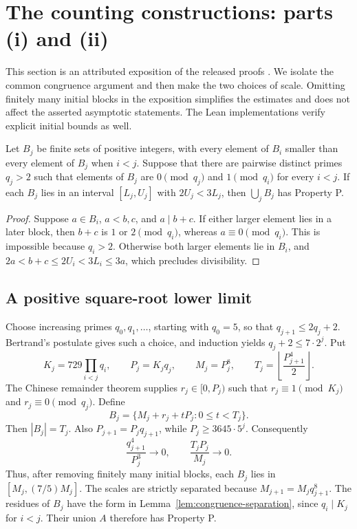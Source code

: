 \section{The counting constructions: parts (i) and (ii)}\label{sec:counting}

This section is an attributed exposition of the released proofs
\cite{NexusI,NexusII}. We isolate the common congruence argument and then
make the two choices of scale. Omitting finitely many initial blocks in
the exposition simplifies the estimates and does not affect the asserted
asymptotic statements. The Lean implementations verify explicit initial
bounds as well.

\begin{lemma}\label{lem:congruence-separation}
Let \(B_j\) be finite sets of positive integers, with every element of
\(B_i\) smaller than every element of \(B_j\) when \(i<j\). Suppose that
there are pairwise distinct primes \(q_j>2\) such that elements of
\(B_j\) are \(0\pmod{q_j}\) and \(1\pmod{q_i}\) for every \(i<j\).
If each \(B_j\) lies in an interval \([L_j,U_j]\) with
\(2U_j<3L_j\), then \(\bigcup_j B_j\) has Property P.
\end{lemma}
\begin{proof}
Suppose \(a\in B_i\), \(a<b,c\), and \(a\mid b+c\).
If either larger element lies in a later block, then \(b+c\) is
\(1\) or \(2\pmod{q_i}\), whereas \(a\equiv0\pmod{q_i}\).
This is impossible because \(q_i>2\). Otherwise both larger elements
lie in \(B_i\), and
\(2a<b+c\le2U_i<3L_i\le3a\), which precludes divisibility.
\end{proof}

\subsection{A positive square-root lower limit}

Choose increasing primes \(q_0,q_1,\ldots\), starting with \(q_0=5\),
so that \(q_{j+1}\le2q_j+2\). Bertrand's postulate gives such a choice,
and induction yields \(q_j+2\le7\cdot2^j\). Put
\[
 K_j=729\prod_{i<j}q_i,\qquad P_j=K_jq_j,\qquad M_j=P_j^8,
 \qquad T_j=\left\lfloor\frac{P_{j+1}^4}{2}\right\rfloor.
\]
The Chinese remainder theorem supplies \(r_j\in[0,P_j)\) such that
\(r_j\equiv1\pmod{K_j}\) and \(r_j\equiv0\pmod{q_j}\).
Define
\[
 B_j=\{M_j+r_j+tP_j:0\le t<T_j\}.
\]
Then \(|B_j|=T_j\). Also \(P_{j+1}=P_jq_{j+1}\), while
\(P_j\ge3645\cdot5^j\). Consequently
\[
 \frac{q_{j+1}^4}{P_j^3}\longrightarrow0,\qquad
 \frac{T_jP_j}{M_j}\longrightarrow0.
\]
Thus, after removing finitely many initial blocks, each \(B_j\) lies
in \([M_j,(7/5)M_j]\). The scales are strictly separated because
\(M_{j+1}=M_jq_{j+1}^8\). The residues of \(B_j\) have the form in
Lemma~\ref{lem:congruence-separation}, since \(q_i\mid K_j\) for
\(i<j\). Their union \(A\) therefore has Property P.


